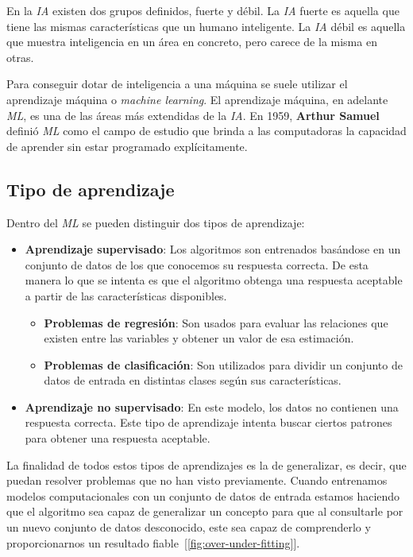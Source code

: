 En la \textit{IA} existen dos grupos definidos, fuerte y débil. La  \textit{IA} fuerte es aquella que tiene las mismas características que un humano inteligente. La \textit{IA} débil es aquella que muestra inteligencia en un área en concreto, pero carece de la misma en otras.

Para conseguir dotar de inteligencia a una máquina se suele utilizar el aprendizaje máquina o \textit{machine learning}. El aprendizaje máquina, en adelante \textit{ML}, es una de las áreas más extendidas de la \textit{IA}. En 1959, \textbf{Arthur Samuel} definió \textit{ML} como el campo de estudio que brinda a las computadoras la capacidad de aprender sin estar programado explícitamente.

\subsection{Tipo de aprendizaje}

Dentro del \textit{ML} se pueden distinguir dos tipos de aprendizaje:

\begin{itemize}
    \item \textbf{Aprendizaje supervisado}: Los algoritmos son entrenados basándose en un conjunto de datos de los que conocemos su respuesta correcta. De esta manera lo que se intenta es que el algoritmo obtenga una respuesta aceptable a partir de las características disponibles.

          \begin{itemize}
              \item \textbf{Problemas de regresión}: Son usados para evaluar las relaciones que existen entre las variables y obtener un valor de esa estimación.
              \item \textbf{Problemas de clasificación}: Son utilizados para dividir un conjunto de datos de entrada en distintas clases según sus características.
          \end{itemize}

    \item \textbf{Aprendizaje no supervisado}: En este modelo, los datos no contienen una respuesta correcta. Este tipo de aprendizaje intenta buscar ciertos patrones para obtener una respuesta aceptable.
\end{itemize}

La finalidad de todos estos tipos de aprendizajes es la de generalizar, es decir, que puedan resolver problemas que no han visto previamente.
Cuando entrenamos modelos computacionales con un conjunto de datos de entrada estamos haciendo que el algoritmo sea capaz de generalizar un concepto para que al consultarle por un nuevo conjunto de datos desconocido, este sea capaz de comprenderlo y proporcionarnos un resultado fiable~[\cref{fig:over-under-fitting}].

